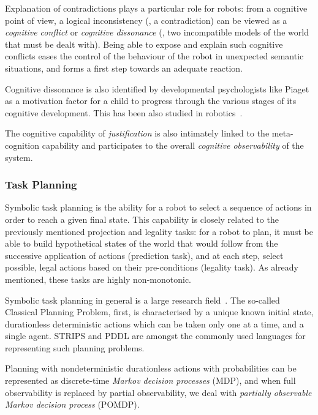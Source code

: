 Explanation of contradictions plays a particular role for robots: from a
cognitive point of view, a logical inconsistency (\ie, a contradiction) can be
viewed as a \emph{cognitive conflict} or \emph{cognitive dissonance} (\ie, two
incompatible models of the world that must be dealt with). Being able to expose
and explain such cognitive conflicts eases the control of the behaviour of the
robot in unexpected semantic situations, and forms a first step towards an
adequate reaction.

Cognitive dissonance is also identified by developmental psychologists like
Piaget as a motivation factor for a child to progress through the various
stages of its cognitive development. This has been also studied in
robotics~\cite{Oudeyer2007}.


The cognitive capability of \emph{justification} is also intimately linked to
the meta-cognition capability and participates to the overall \emph{cognitive
observability} of the system.

\subsubsection{Task Planning}
\label{sect|planning}

Symbolic task planning is the ability for a robot to select a sequence of
actions in order to reach a given final state. This capability is closely
related to the previously mentioned projection and legality tasks: for a robot
to plan, it must be able to build hypothetical states of the world that would
follow from the successive application of actions (prediction task), and at
each step, select possible, legal actions based on their pre-conditions
(legality task). As already mentioned, these tasks are highly non-monotonic.


Symbolic task planning in general is a large research
field~\cite{Russell2009planning}. The so-called Classical Planning Problem,
first, is characterised by a unique known initial state, durationless
deterministic actions which can be taken only one at a time, and a single
agent. STRIPS and PDDL are amongst the commonly used languages for representing
such planning problems.

Planning with nondeterministic durationless actions with probabilities can be
represented as discrete-time \emph{Markov decision processes} (MDP), and when
full observability is replaced by partial observability, we deal with
\emph{partially observable Markov decision process} (POMDP).

